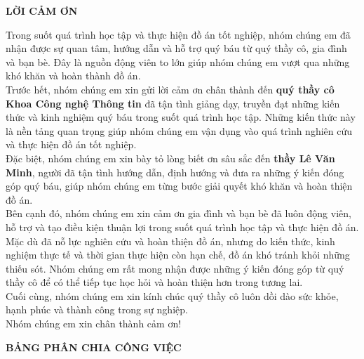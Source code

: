 \documentclass{report}
\begin{document}
\newpage
\begin{center}
    \fontsize{18pt}{22pt}\selectfont \textbf{LỜI CẢM ƠN}
\end{center}
Trong suốt quá trình học tập và thực hiện đồ án tốt nghiệp, nhóm chúng em đã nhận được sự quan tâm, hướng dẫn và hỗ trợ 
quý báu từ quý thầy cô, gia đình và bạn bè. Đây là nguồn động viên to lớn giúp nhóm chúng em vượt qua những khó khăn và 
hoàn thành đồ án.\\ 

Trước hết, nhóm chúng em xin gửi lời cảm ơn chân thành đến \textbf{quý thầy cô Khoa Công nghệ Thông tin} đã tận tình giảng
 dạy, truyền đạt những kiến thức và kinh nghiệm quý báu trong suốt quá trình học tập. Những kiến thức này là nền tảng quan
  trọng giúp nhóm chúng em vận dụng vào quá trình nghiên cứu và thực hiện đồ án tốt nghiệp.\\

Đặc biệt, nhóm chúng em xin bày tỏ lòng biết ơn sâu sắc đến \textbf{thầy Lê Văn Minh}, người đã tận tình hướng dẫn, định
 hướng và đưa ra những ý kiến đóng góp quý báu, giúp nhóm chúng em từng bước giải quyết khó khăn và hoàn thiện đồ án.\\

Bên cạnh đó, nhóm chúng em xin cảm ơn gia đình và bạn bè đã luôn động viên, hỗ trợ và tạo điều kiện thuận lợi trong suốt
 quá trình học tập và thực hiện đồ án.\\

Mặc dù đã nỗ lực nghiên cứu và hoàn thiện đồ án, nhưng do kiến thức, kinh nghiệm thực tế và thời gian thực hiện còn hạn chế,
 đồ án khó tránh khỏi những thiếu sót. Nhóm chúng em rất mong nhận được những ý kiến đóng góp từ quý thầy cô để có thể tiếp
  tục học hỏi và hoàn thiện hơn trong tương lai.\\

Cuối cùng, nhóm chúng em xin kính chúc quý thầy cô luôn dồi dào sức khỏe, hạnh phúc và thành công trong sự nghiệp.\\

Nhóm chúng em xin chân thành cảm ơn!

\newpage
\begin{center}
    \fontsize{18pt}{22pt}\selectfont \textbf{BẢNG PHÂN CHIA CÔNG VIỆC}
\end{center}
\end{document}
